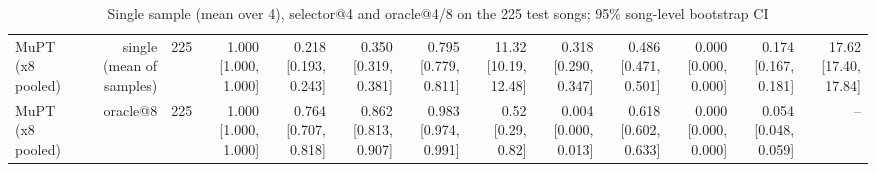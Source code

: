 \begin{table}[t]
\begin{tabular}{lrrrrrrrrrrrr}
MuPT (x8 pooled) & single (mean of samples) & 225 & 1.000 [1.000, 1.000] & 0.218 [0.193, 0.243] & 0.350 [0.319, 0.381] & 0.795 [0.779, 0.811] & 11.32 [10.19, 12.48] & 0.318 [0.290, 0.347] & 0.486 [0.471, 0.501] & 0.000 [0.000, 0.000] & 0.174 [0.167, 0.181] & 17.62 [17.40, 17.84] \\
MuPT (x8 pooled) & oracle@8 & 225 & 1.000 [1.000, 1.000] & 0.764 [0.707, 0.818] & 0.862 [0.813, 0.907] & 0.983 [0.974, 0.991] & 0.52 [0.29, 0.82] & 0.004 [0.000, 0.013] & 0.618 [0.602, 0.633] & 0.000 [0.000, 0.000] & 0.054 [0.048, 0.059] & – \\
\bottomrule
\end{tabular}
\caption{Single sample (mean over 4), selector@4 and oracle@4/8 on the 225 test songs; 95\% song-level bootstrap CI}
\label{tab:decoding_comparison}
\end{table}
